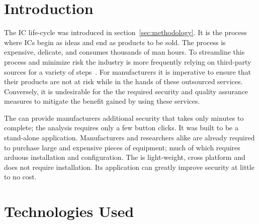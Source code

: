 \label{chapter:implementation}
\section{Introduction}
The \acrfull{IC} life-cycle was introduced in section~\ref{sec:methodology}.
It is the process where \acrshort{IC}s begin as ideas and end as products to be sold.
The process is expensive, delicate, and consumes thousands of man hours.
To streamline this process and minimize risk the industry is more frequently relying on third-party sources for a variety of steps~\cite{thirdPartyLogistics}. 
For manufacturers it is imperative to ensure that their products are not at risk while in the hands of these outsourced services. 
Conversely, it is undesirable for the the required security and quality assurance measures to mitigate the benefit gained by using these services. 

The \NameNoPeriod can provide manufacturers additional security that takes only minutes to complete; the analysis requires only a few button clicks.
It was built to be a stand-alone application.
Manufacturers and researchers alike are already required to purchase large and expensive pieces of equipment; much of which requires arduous installation and configuration.
The \NameNoPeriod is light-weight, cross platform and does not require installation.
Its application can greatly improve security at little to no cost.

\section{Technologies Used}
